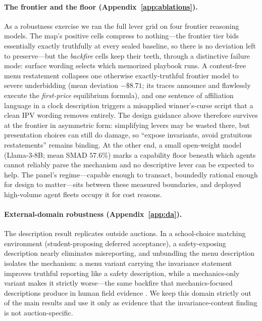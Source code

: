 \paragraph{The frontier and the floor (Appendix~\ref{app:ablations}).}
As a robustness exercise we ran the full lever grid on four frontier reasoning models. The map's positive cells compress to nothing---the frontier tier bids essentially exactly truthfully at every sealed baseline, so there is no deviation left to preserve---but the \emph{backfire} cells keep their teeth, through a distinctive failure mode: surface wording selects which memorized playbook runs. A content-free menu restatement collapses one otherwise exactly-truthful frontier model to severe underbidding (mean deviation $-\$8.71$; its traces announce and flawlessly execute the \emph{first-price} equilibrium formula), and one sentence of affiliation language in a clock description triggers a misapplied winner's-curse script that a clean IPV wording removes entirely. The design guidance above therefore survives at the frontier in asymmetric form: simplifying levers may be wasted there, but presentation choices can still do damage, so ``expose invariants, avoid gratuitous restatements'' remains binding. At the other end, a small open-weight model (Llama-3-8B; mean SMAD $57.6\%$) marks a capability floor beneath which agents cannot reliably parse the mechanism and no descriptive lever can be expected to help. The panel's regime---capable enough to transact, boundedly rational enough for design to matter---sits between these measured boundaries, and deployed high-volume agent fleets occupy it for cost reasons.

\paragraph{External-domain robustness (Appendix~\ref{app:da}).}
The description result replicates outside auctions. In a school-choice matching environment (student-proposing deferred acceptance), a safety-exposing description nearly eliminates misreporting, and unbundling the menu description isolates the mechanism: a menu variant carrying the invariance statement improves truthful reporting like a safety description, while a mechanics-only variant makes it strictly worse---the same backfire that mechanics-focused descriptions produce in human field evidence \citep{guillen2018effectiveness}. We keep this domain strictly out of the main results and use it only as evidence that the invariance-content finding is not auction-specific.

